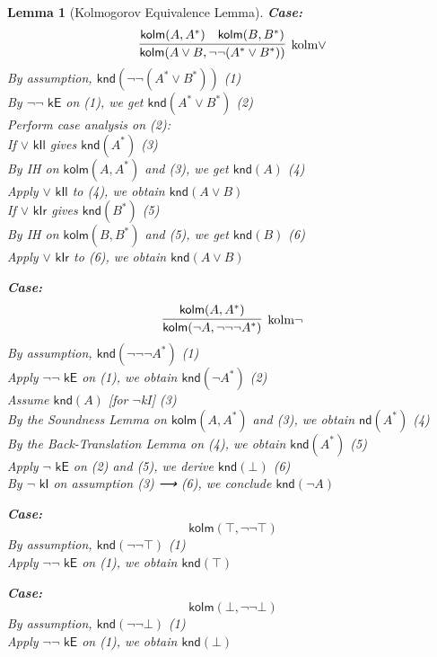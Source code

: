\documentclass{article}
\newtheorem{lemma}{Lemma}
\begin{document}
\begin{lemma}[Kolmogorov Equivalence Lemma]
    \medskip
    
    \noindent \textbf{Case:} 
    \[
    \infer[\text{kolm$\vee$}]{\textsf{kolm}(A \vee B, \neg\neg (A^* \vee B^*))}{
      \textsf{kolm}(A, A^*) \quad \textsf{kolm}(B, B^*)
    }
    \]
    By assumption, $\textsf{knd}(\neg\neg (A^* \vee B^*))$ \hfill (1)\\
    By $\textsf{$\neg\neg$ kE}$ on (1), we get $\textsf{knd}(A^* \vee B^*)$ \hfill (2)\\
    Perform case analysis on (2):\\
    \quad If $\textsf{$\vee$ kIl}$ gives $\textsf{knd}(A^*)$ \hfill (3)\\
    \quad \quad By IH on $\textsf{kolm}(A, A^*)$ and (3), we get $\textsf{knd}(A)$ \hfill (4)\\
    \quad \quad Apply $\textsf{$\vee$ kIl}$ to (4), we obtain $\textsf{knd}(A \vee B)$\\
    \quad If $\textsf{$\vee$ kIr}$ gives $\textsf{knd}(B^*)$ \hfill (5)\\
    \quad \quad By IH on $\textsf{kolm}(B, B^*)$ and (5), we get $\textsf{knd}(B)$ \hfill (6)\\
    \quad \quad Apply $\textsf{$\vee$ kIr}$ to (6), we obtain $\textsf{knd}(A \vee B)$
    
    \medskip
    
    \noindent \textbf{Case:} 
    \[
    \infer[\text{kolm$\neg$}]{\textsf{kolm}(\neg A, \neg\neg\neg A^*)}{
      \textsf{kolm}(A, A^*)
    }
    \]
    By assumption, $\textsf{knd}(\neg\neg\neg A^*)$ \hfill (1)\\
    Apply $\textsf{$\neg\neg$ kE}$ on (1), we obtain $\textsf{knd}(\neg A^*)$ \hfill (2)\\
    Assume $\textsf{knd}(A)$ [for $\neg$kI] \hfill (3)\\
    By the Soundness Lemma on $\textsf{kolm}(A, A^*)$ and (3), we obtain $\textsf{nd}(A^*)$ \hfill (4)\\
    By the Back-Translation Lemma on (4), we obtain $\textsf{knd}(A^*)$ \hfill (5)\\
    Apply $\textsf{$\neg$ kE}$ on (2) and (5), we derive $\textsf{knd}(\bot)$ \hfill (6)\\
    By $\textsf{$\neg$ kI}$ on assumption (3) ⟶ (6), we conclude $\textsf{knd}(\neg A)$
    
    \medskip
    
    \noindent \textbf{Case:} 
    \[
    \textsf{kolm}(\top, \neg\neg \top)
    \]
    By assumption, $\textsf{knd}(\neg\neg \top)$ \hfill (1)\\
    Apply $\textsf{$\neg\neg$ kE}$ on (1), we obtain $\textsf{knd}(\top)$
    
    \medskip
    
    \noindent \textbf{Case:} 
    \[
    \textsf{kolm}(\bot, \neg\neg \bot)
    \]
    By assumption, $\textsf{knd}(\neg\neg \bot)$ \hfill (1)\\
    Apply $\textsf{$\neg\neg$ kE}$ on (1), we obtain $\textsf{knd}(\bot)$
    \end{lemma}
\end{document}
